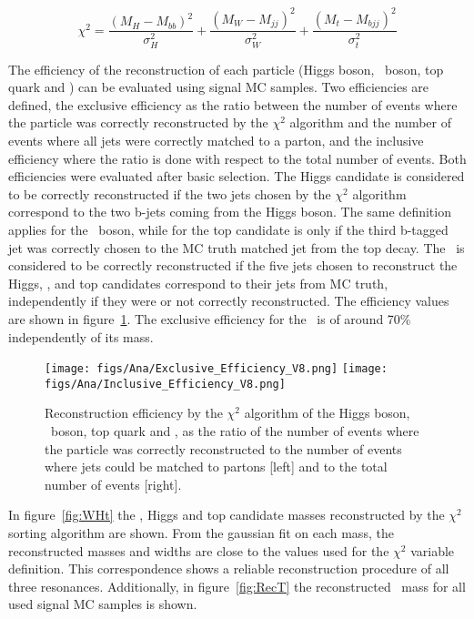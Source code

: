 \begin{equation}
\chi^{2}=\frac{(M_{H}-M_{bb})^{2}}{\sigma_{H}^{2}}+\frac{(M_{W}-M_{jj})^{2}}{\sigma_{W}^{2}}+\frac{(M_{t}-M_{bjj})^{2}}{\sigma_{t}^{2}}
\label{eq:chi2def}
\end{equation}

The efficiency of the reconstruction of each particle (Higgs boson, \W~boson, top quark and \Tp) can be evaluated using signal MC samples. Two efficiencies are defined, the exclusive efficiency as the ratio between the number of events where the particle was correctly reconstructed by the $\chi^{2}$ algorithm and the number of events where all jets were correctly matched to a parton, and the inclusive efficiency where the ratio is done with respect to the total number of events. Both efficiencies were evaluated after basic selection. The Higgs candidate is considered to be correctly reconstructed if the two jets chosen by the $\chi^{2}$ algorithm correspond to the two b-jets coming from the Higgs boson. The same definition applies for the \W~boson, while for the top candidate is only if the third b-tagged jet was correctly chosen to the MC truth matched jet from the top decay. The \Tp~is considered to be correctly reconstructed if the five jets chosen to reconstruct the Higgs, \W, and top candidates correspond to their jets from MC truth, independently if they were or not correctly reconstructed. The efficiency values are shown in figure~\ref{fig:RecEff}. The exclusive efficiency for the \Tp~is of around 70\% independently of its mass.

\begin{figure}[!Hhtbp]
  \begin{center}
    \texttt{[image: figs/Ana/Exclusive\_Efficiency\_V8.png]}
    \texttt{[image: figs/Ana/Inclusive\_Efficiency\_V8.png]}
    \caption{Reconstruction efficiency by the $\chi^{2}$ algorithm of the Higgs boson, \W~boson, top quark and \Tp, as the ratio of the number of events where the particle was correctly reconstructed to the number of events where jets could be matched to partons [left] and to the total number of events [right].}
    \label{fig:RecEff}
  \end{center}
\end{figure}

In figure~\ref{fig:WHt} the \W, Higgs and top candidate masses reconstructed by the $\chi^{2}$ sorting algorithm are shown. From the gaussian fit on each mass, the reconstructed masses and widths are close to the values used for the $\chi^{2}$ variable definition. This correspondence shows a reliable reconstruction procedure of all three resonances. Additionally, in figure~\ref{fig:RecT} the reconstructed \Tp~mass for all used signal MC samples is shown.

